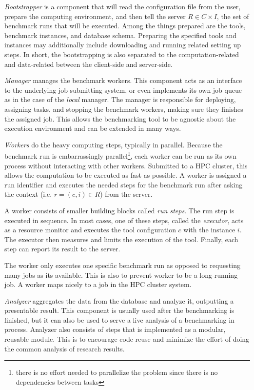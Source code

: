 \emph{Bootstrapper} is a component that will read the configuration file from the user, prepare the computing environment, and then tell the server $R \in C \times I$, the set of benchmark runs that will be executed.
Among the things prepared are the tools, benchmark instances, and database schema.
Preparing the specified tools and instances may additionally include downloading and running related setting up steps.
In short, the bootstrapping is also separated to the computation-related and data-related between the client-side and server-side.

\emph{Manager} manages the benchmark workers.
This component acts as an interface to the underlying job submitting system, or even implements its own job queue as in the case of the \emph{local} manager.
The manager is responsible for deploying, assigning tasks, and stopping the benchmark workers, making sure they finishes the assigned job.
This allows the benchmarking tool to be agnostic about the execution environment and can be extended in many ways.

\emph{Workers} do the heavy computing steps, typically in parallel.
Because the benchmark run is embarrassingly parallel\footnote{there is no effort needed to parallelize the problem since there is no dependencies between tasks}, each worker can be run as its own process without interacting with other workers.
Submitted to a HPC cluster, this allows the computation to be executed as fast as possible.
A worker is assigned a run identifier and executes the needed steps for the benchmark run after asking the context (i.e. $r = (c, i) \in R$) from the server.

A worker consists of smaller building blocks called \emph{run steps}.
The run step is executed in sequence.
In most cases, one of these steps, called the \emph{executor}, acts as a resource monitor and executes the tool configuration $c$ with the instance $i$.
The executor then measures and limits the execution of the tool.
Finally, each step can report its result to the server.

The worker only executes one specific benchmark run as opposed to requesting many jobs as its available.
This is also to prevent worker to be a long-running job.
A worker maps nicely to a job in the HPC cluster system.

\emph{Analyzer} aggregates the data from the database and analyze it, outputting a presentable result.
This component is usually used after the benchmarking is finished, but it can also be used to serve a live analysis of a benchmarking in process.
Analyzer also consists of steps that is implemented as a modular, reusable module.
This is to encourage code reuse and minimize the effort of doing the common analysis of research results.


